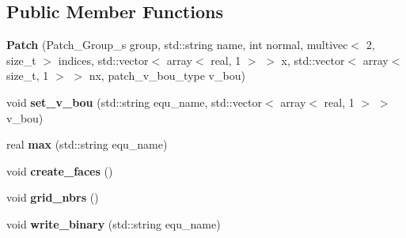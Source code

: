\subsection*{Public Member Functions}
\begin{DoxyCompactItemize}
\item 
\hypertarget{classPatch_a74d349d49bdf800d6f7d6c31c7f39eb3}{{\bfseries Patch} (Patch\+\_\+\+Group\+\_\+s group, std\+::string name, int normal, multivec$<$ 2, size\+\_\+t $>$ indices, std\+::vector$<$ array$<$ real, 1 $>$ $>$ x, std\+::vector$<$ array$<$ size\+\_\+t, 1 $>$ $>$ nx, patch\+\_\+v\+\_\+bou\+\_\+type v\+\_\+bou)}\label{classPatch_a74d349d49bdf800d6f7d6c31c7f39eb3}

\item 
\hypertarget{classPatch_af0311eccfd4f4fd356785f7b23dc8fa2}{void {\bfseries set\+\_\+v\+\_\+bou} (std\+::string equ\+\_\+name, std\+::vector$<$ array$<$ real, 1 $>$ $>$ v\+\_\+bou)}\label{classPatch_af0311eccfd4f4fd356785f7b23dc8fa2}

\item 
\hypertarget{classPatch_aa0a6036ed90bf4a98cc498f925fb530d}{real {\bfseries max} (std\+::string equ\+\_\+name)}\label{classPatch_aa0a6036ed90bf4a98cc498f925fb530d}

\item 
\hypertarget{classPatch_a2af23d9c0ebbb60d35c24bb3fb582b64}{void {\bfseries create\+\_\+faces} ()}\label{classPatch_a2af23d9c0ebbb60d35c24bb3fb582b64}

\item 
\hypertarget{classPatch_ae57b4223cce6c1ed9dbaaa5080a2501a}{void {\bfseries grid\+\_\+nbrs} ()}\label{classPatch_ae57b4223cce6c1ed9dbaaa5080a2501a}

\item 
\hypertarget{classPatch_ae91999227e29d49f6f762b18e03fb5ac}{void {\bfseries write\+\_\+binary} (std\+::string equ\+\_\+name)}\label{classPatch_ae91999227e29d49f6f762b18e03fb5ac}

\end{DoxyCompactItemize}
